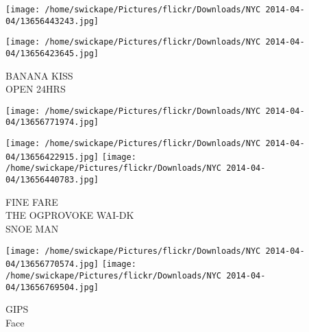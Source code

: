 \documentclass[10pt,letterpaper]{article}
\begin{document}
\texttt{[image: /home/swickape/Pictures/flickr/Downloads/NYC 2014-04-04/13656443243.jpg]}

\vspace{0.25in}
\texttt{[image: /home/swickape/Pictures/flickr/Downloads/NYC 2014-04-04/13656423645.jpg]}

BANANA KISS\\
OPEN 24HRS
\pagebreak

\texttt{[image: /home/swickape/Pictures/flickr/Downloads/NYC 2014-04-04/13656771974.jpg]}

\vspace{0.25in}
\texttt{[image: /home/swickape/Pictures/flickr/Downloads/NYC 2014-04-04/13656422915.jpg]}
\texttt{[image: /home/swickape/Pictures/flickr/Downloads/NYC 2014-04-04/13656440783.jpg]}

FINE FARE\\
THE OGPROVOKE WAI{-}DK\\
SNOE MAN
\pagebreak

\texttt{[image: /home/swickape/Pictures/flickr/Downloads/NYC 2014-04-04/13656770574.jpg]}
\texttt{[image: /home/swickape/Pictures/flickr/Downloads/NYC 2014-04-04/13656769504.jpg]}

GIPS\\
Face
\pagebreak
\end{document}
